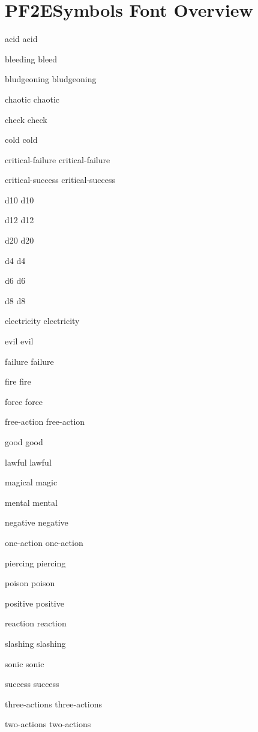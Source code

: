 \documentclass[paper=a4]{scrartcl}
\newcommand{\pfsymbol}[1]{%
  \mbox{\pfsymbols\selectfont#1}
}
\begin{document}
\pagestyle{empty}
\renewcommand*{\sectionformat}{}

\section{PF2ESymbols Font Overview}

\noindent

\pfsymbol{acid} acid

\pfsymbol{bleeding} bleed

\pfsymbol{bludgeoning} bludgeoning

\pfsymbol{chaotic} chaotic

\pfsymbol{check} check

\pfsymbol{cold} cold

\pfsymbol{critical-failure} critical-failure

\pfsymbol{critical-success} critical-success

\pfsymbol{d10} d10

\pfsymbol{d12} d12

\pfsymbol{d20} d20

\pfsymbol{d4} d4

\pfsymbol{d6} d6

\pfsymbol{d8} d8

\pfsymbol{electricity} electricity

\pfsymbol{evil} evil

\pfsymbol{failure} failure

\pfsymbol{fire} fire

\pfsymbol{force} force

\pfsymbol{free-action} free-action

\pfsymbol{good} good

\pfsymbol{lawful} lawful

\pfsymbol{magical} magic

\pfsymbol{mental} mental

\pfsymbol{negative} negative

\pfsymbol{one-action} one-action

\pfsymbol{piercing} piercing

\pfsymbol{poison} poison

\pfsymbol{positive} positive

\pfsymbol{reaction} reaction

\pfsymbol{slashing} slashing

\pfsymbol{sonic} sonic

\pfsymbol{success} success

\pfsymbol{three-actions} three-actions

\pfsymbol{two-actions} two-actions
\end{document}
